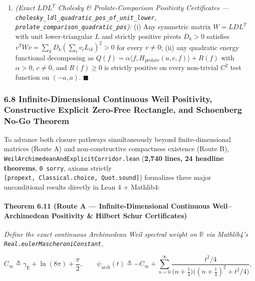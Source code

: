 \documentclass[
  11pt,
]{article}
\begin{document}
\begin{enumerate}
  \[\int_{-a}^{a} f(x)\Big(-f''(x) + V_{\text{eff}}(x)\,f(x)\Big)\,dx = \int_{-a}^{a} \left(f'(x) - \frac{v_0'(x)}{v_0(x)} f(x)\right)^2 dx \ge 0.\]
\item
  \emph{(Exact \(LDL^T\) Cholesky \& Prolate-Comparison Positivity
  Certificates ---
  \texttt{cholesky\_ldl\_quadratic\_pos\_of\_unit\_lower},
  \texttt{prolate\_comparison\_quadratic\_pos}):} (i) Any symmetric
  matrix \(W = L D L^T\) with unit lower-triangular \(L\) and strictly
  positive pivots \(D_k > 0\) satisfies
  \(v^T W v = \sum_k D_k (\sum_i v_i L_{ik})^2 > 0\) for every
  \(v \neq 0\); (ii) any quadratic energy functional decomposing as
  \(Q(f) = \alpha \langle f, H_{\text{prolate}}(a, c, f) \rangle + R(f)\)
  with \(\alpha > 0\), \(c \neq 0\), and \(R(f) \ge 0\) is strictly
  positive on every non-trivial \(C^2\) test function on \((-a, a)\).
  \(\blacksquare\)
\end{enumerate}

\subsubsection{6.8 Infinite-Dimensional Continuous Weil Positivity,
Constructive Explicit Zero-Free Rectangle, and Schoenberg No-Go
Theorem}\label{infinite-dimensional-continuous-weil-positivity-constructive-explicit-zero-free-rectangle-and-schoenberg-no-go-theorem}

To advance both closure pathways simultaneously beyond
finite-dimensional matrices (Route A) and non-constructive compactness
existence (Route B), \texttt{WeilArchimedeanAndExplicitCorridor.lean}
(\textbf{2,740 lines, 24 headline theorems}, \texttt{0\ sorry}, axioms
strictly \texttt{{[}propext,\ Classical.choice,\ Quot.sound{]}})
formalizes three major unconditional results directly in Lean 4 +
Mathlib4:

\paragraph{Theorem 6.11 (Route A --- Infinite-Dimensional Continuous
Weil--Archimedean Positivity \& Hilbert Schur
Certificates)}\label{theorem-6.11-route-a-infinite-dimensional-continuous-weilarchimedean-positivity-hilbert-schur-certificates}

\emph{Define the exact continuous Archimedean Weil spectral weight on
\(\mathbb{R}\) via Mathlib4's \texttt{Real.eulerMascheroniConstant},}

\[C_\infty \triangleq \gamma_{\text{E}} + \ln(8\pi) + \frac{\pi}{2}, \qquad \psi_{\text{arch}}(t) \triangleq -C_\infty + \sum_{n=0}^\infty \frac{t^2/4}{\big(n + \tfrac{1}{4}\big)\big((n + \tfrac{1}{4})^2 + t^2/4\big)},\]
\end{document}
